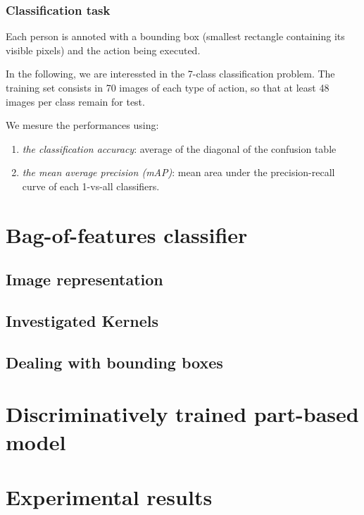 \documentclass{beamer}
\begin{document}

\begin{frame}
\frametitle{Classification task}
Each person is annoted with a bounding box (smallest rectangle containing its visible pixels)
and the action being executed.

\vspace{0.3cm}
In the following, we are interessted in the 7-class classification problem.
The training set consists in 70 images of each type of action, so that at least 48 images
per class remain for test.

\vspace{0.3cm}
We mesure the performances using:
\begin{enumerate}[i]
\item {\em the classification accuracy}: average of the diagonal of the confusion table
\item {\em the mean average precision (mAP)}: mean area under the precision-recall curve of each 1-vs-all classifiers.
\end{enumerate}

\end{frame}


\section{Bag-of-features classifier}
\subsection{Image representation}
\subsection{Investigated Kernels}
\subsection{Dealing with bounding boxes}
\begin{frame}

\end{frame}


\section{Discriminatively trained part-based model}
\begin{frame}

\end{frame}


\section{Experimental results}
\begin{frame}

\end{frame}
\end{document}
